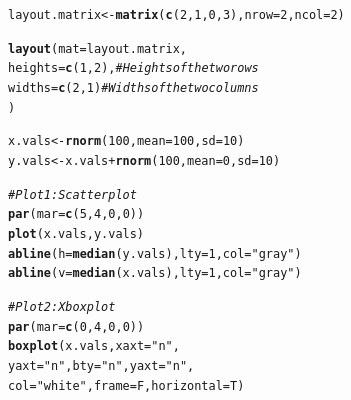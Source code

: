 \documentclass{tufte-book}\usepackage[]{graphicx}\usepackage[]{color}
\makeatletter
\newcommand{\hlnum}[1]{\textcolor[rgb]{0.686,0.059,0.569}{#1}}%
\newcommand{\hlstr}[1]{\textcolor[rgb]{0.192,0.494,0.8}{#1}}%
\newcommand{\hlcom}[1]{\textcolor[rgb]{0.678,0.584,0.686}{\textit{#1}}}%
\newcommand{\hlopt}[1]{\textcolor[rgb]{0,0,0}{#1}}%
\newcommand{\hlstd}[1]{\textcolor[rgb]{0.345,0.345,0.345}{#1}}%
\newcommand{\hlkwb}[1]{\textcolor[rgb]{0.69,0.353,0.396}{#1}}%
\newcommand{\hlkwc}[1]{\textcolor[rgb]{0.333,0.667,0.333}{#1}}%
\newcommand{\hlkwd}[1]{\textcolor[rgb]{0.737,0.353,0.396}{\textbf{#1}}}%
\newenvironment{kframe}{%
 \def\at@end@of@kframe{}%
 \ifinner\ifhmode%
  \def\at@end@of@kframe{\end{minipage}}%
  \begin{minipage}{\columnwidth}%
 \fi\fi%
 \def\FrameCommand##1{\hskip\@totalleftmargin \hskip-\fboxsep
 \colorbox{shadecolor}{##1}\hskip-\fboxsep
     \hskip-\linewidth \hskip-\@totalleftmargin \hskip\columnwidth}%
 \MakeFramed {\advance\hsize-\width
   \@totalleftmargin\z@ \linewidth\hsize
   \@setminipage}}%
 {\par\unskip\endMakeFramed%
 \at@end@of@kframe}
\newenvironment{knitrout}{}{} %
\makeatother
\begin{document}
\begin{footnotesize}
\begin{knitrout}
\color{fgcolor}\begin{kframe}
\begin{alltt}
\hlstd{layout.matrix} \hlkwb{<-} \hlkwd{matrix}\hlstd{(}\hlkwd{c}\hlstd{(}\hlnum{2}\hlstd{,} \hlnum{1}\hlstd{,} \hlnum{0}\hlstd{,} \hlnum{3}\hlstd{),} \hlkwc{nrow} \hlstd{=} \hlnum{2}\hlstd{,} \hlkwc{ncol} \hlstd{=} \hlnum{2}\hlstd{)}

\hlkwd{layout}\hlstd{(}\hlkwc{mat} \hlstd{= layout.matrix,}
       \hlkwc{heights} \hlstd{=} \hlkwd{c}\hlstd{(}\hlnum{1}\hlstd{,} \hlnum{2}\hlstd{),} \hlcom{# Heights of the two rows}
       \hlkwc{widths} \hlstd{=} \hlkwd{c}\hlstd{(}\hlnum{2}\hlstd{,} \hlnum{1}\hlstd{)} \hlcom{# Widths of the two columns}
       \hlstd{)}

\hlstd{x.vals} \hlkwb{<-} \hlkwd{rnorm}\hlstd{(}\hlnum{100}\hlstd{,} \hlkwc{mean} \hlstd{=} \hlnum{100}\hlstd{,} \hlkwc{sd} \hlstd{=} \hlnum{10}\hlstd{)}
\hlstd{y.vals} \hlkwb{<-} \hlstd{x.vals} \hlopt{+} \hlkwd{rnorm}\hlstd{(}\hlnum{100}\hlstd{,} \hlkwc{mean} \hlstd{=} \hlnum{0}\hlstd{,} \hlkwc{sd} \hlstd{=} \hlnum{10}\hlstd{)}

\hlcom{# Plot 1: Scatterplot}
\hlkwd{par}\hlstd{(}\hlkwc{mar} \hlstd{=} \hlkwd{c}\hlstd{(}\hlnum{5}\hlstd{,} \hlnum{4}\hlstd{,} \hlnum{0}\hlstd{,} \hlnum{0}\hlstd{))}
\hlkwd{plot}\hlstd{(x.vals, y.vals)}
\hlkwd{abline}\hlstd{(}\hlkwc{h} \hlstd{=} \hlkwd{median}\hlstd{(y.vals),} \hlkwc{lty} \hlstd{=} \hlnum{1}\hlstd{,} \hlkwc{col} \hlstd{=} \hlstr{"gray"}\hlstd{)}
\hlkwd{abline}\hlstd{(}\hlkwc{v} \hlstd{=} \hlkwd{median}\hlstd{(x.vals),} \hlkwc{lty} \hlstd{=} \hlnum{1}\hlstd{,} \hlkwc{col} \hlstd{=} \hlstr{"gray"}\hlstd{)}


\hlcom{# Plot 2: X boxplot}
\hlkwd{par}\hlstd{(}\hlkwc{mar} \hlstd{=} \hlkwd{c}\hlstd{(}\hlnum{0}\hlstd{,} \hlnum{4}\hlstd{,} \hlnum{0}\hlstd{,} \hlnum{0}\hlstd{))}
\hlkwd{boxplot}\hlstd{(x.vals,} \hlkwc{xaxt} \hlstd{=} \hlstr{"n"}\hlstd{,}
        \hlkwc{yaxt} \hlstd{=} \hlstr{"n"}\hlstd{,} \hlkwc{bty} \hlstd{=} \hlstr{"n"}\hlstd{,} \hlkwc{yaxt} \hlstd{=} \hlstr{"n"}\hlstd{,}
        \hlkwc{col} \hlstd{=} \hlstr{"white"}\hlstd{,} \hlkwc{frame} \hlstd{= F,} \hlkwc{horizontal} \hlstd{= T)}


\end{alltt}
\end{kframe}
\end{knitrout}
\end{footnotesize}
\end{document}

